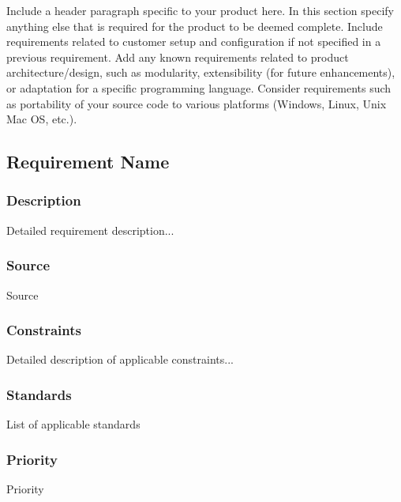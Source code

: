 Include a header paragraph specific to your product here. In this section specify 
anything else that is required for the product to be deemed complete. Include 
requirements related to customer setup and configuration if not specified in a 
previous requirement. Add any known requirements related to product 
architecture/design, such as modularity, extensibility (for future enhancements), or 
adaptation for a specific programming language. Consider requirements such as 
portability of your source code to various platforms (Windows, Linux, Unix Mac OS, etc.).

\subsection{Requirement Name}
\subsubsection{Description}
Detailed requirement description...
\subsubsection{Source}
Source
\subsubsection{Constraints}
Detailed description of applicable constraints...
\subsubsection{Standards}
List of applicable standards
\subsubsection{Priority}
Priority
